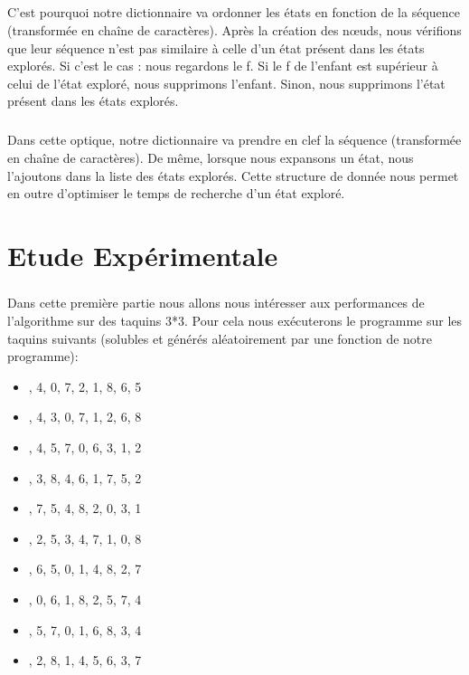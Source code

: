\documentclass[10pt,a4paper]{report}
\begin{document}
\paragraph{}{C'est pourquoi notre dictionnaire va ordonner les états en fonction de la séquence (transformée en chaîne de caractères). Après la création des nœuds, nous vérifions que leur séquence n'est pas similaire à celle d'un état présent dans les états explorés. Si c'est le cas : nous regardons le f. Si le f de l'enfant est supérieur à celui de l'état exploré, nous supprimons l'enfant.  Sinon, nous supprimons l'état présent dans les états explorés.}
\paragraph{}{Dans cette optique, notre dictionnaire va prendre en clef la séquence (transformée en chaîne de caractères). De même, lorsque nous expansons un état, nous l'ajoutons dans la liste des états explorés. Cette structure de donnée nous permet en outre d'optimiser le temps de recherche d'un état exploré.}



\chapter{Etude Expérimentale}
\paragraph{}{Dans cette première partie nous allons nous intéresser aux performances de l'algorithme sur des taquins 3*3. Pour cela nous exécuterons le programme sur les taquins suivants (solubles et générés aléatoirement par une fonction de notre programme): }
\begin{itemize}
\item {\ttfamily{}, 4, 0, 7, 2, 1, 8, 6, 5\rbrack}
\item {\ttfamily{}, 4, 3, 0, 7, 1, 2, 6, 8\rbrack}
\item {\ttfamily{}, 4, 5, 7, 0, 6, 3, 1, 2\rbrack}
\item {\ttfamily{}, 3, 8, 4, 6, 1, 7, 5, 2\rbrack}
\item {\ttfamily{}, 7, 5, 4, 8, 2, 0, 3, 1\rbrack}
\item {\ttfamily{}, 2, 5, 3, 4, 7, 1, 0, 8\rbrack}
\item {\ttfamily{}, 6, 5, 0, 1, 4, 8, 2, 7\rbrack}
\item {\ttfamily{}, 0, 6, 1, 8, 2, 5, 7, 4\rbrack}
\item {\ttfamily{}, 5, 7, 0, 1, 6, 8, 3, 4\rbrack}
\item {\ttfamily{}, 2, 8, 1, 4, 5, 6, 3, 7\rbrack}
\end{itemize}
\end{document}
